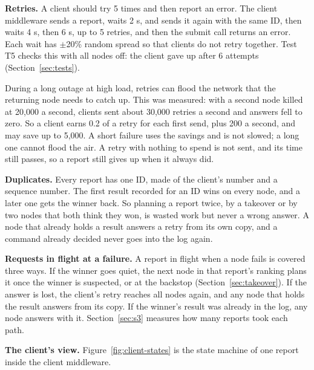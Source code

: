 \textbf{Retries.} A client should try 5 times and then report an error. The client middleware sends a report, waits 2 s, and sends it again with the same ID, then waits 4 s, then 6 s, up to 5 retries, and then the submit call returns an error. Each wait has $\pm$20\% random spread so that clients do not retry together. Test T5 checks this with all nodes off: the client gave up after 6 attempts (Section~\ref{sec:tests}).

During a long outage at high load, retries can flood the network that the returning node needs to catch up. This was measured: with a second node killed at 20,000 a second, clients sent about 30,000 retries a second and answers fell to zero. So a client earns 0.2 of a retry for each first send, plus 200 a second, and may save up to 5,000. A short failure uses the savings and is not slowed; a long one cannot flood the air. A retry with nothing to spend is not sent, and its time still passes, so a report still gives up when it always did.

\textbf{Duplicates.} Every report has one ID, made of the client's number and a sequence number. The first result recorded for an ID wins on every node, and a later one gets the winner back. So planning a report twice, by a takeover or by two nodes that both think they won, is wasted work but never a wrong answer. A node that already holds a result answers a retry from its own copy, and a command already decided never goes into the log again.

\textbf{Requests in flight at a failure.} A report in flight when a node fails is covered three ways. If the winner goes quiet, the next node in that report's ranking plans it once the winner is suspected, or at the backstop (Section~\ref{sec:takeover}). If the answer is lost, the client's retry reaches all nodes again, and any node that holds the result answers from its copy. If the winner's result was already in the log, any node answers with it. Section~\ref{sec:s3} measures how many reports took each path.

\textbf{The client's view.} Figure~\ref{fig:client-states} is the state machine of one report inside the client middleware.

